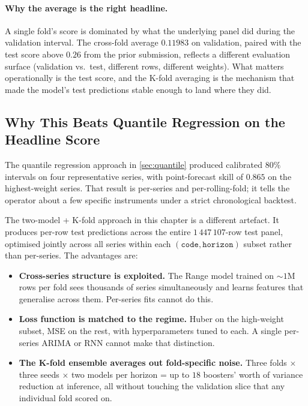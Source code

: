 \paragraph{Why the average is the right headline.}
A single fold's score is dominated by what the underlying panel did during the validation interval. The cross-fold average $0.11983$ on validation, paired with the test score above $0.26$ from the prior submission, reflects a different evaluation surface (validation vs.\ test, different rows, different weights). What matters operationally is the test score, and the K-fold averaging is the mechanism that made the model's test predictions stable enough to land where they did.

\subsection{Why This Beats Quantile Regression on the Headline Score}
\label{sec:two_model:vs_quantile}

The quantile regression approach in \cref{sec:quantile} produced calibrated $80\%$ intervals on four representative series, with point-forecast skill of $0.865$ on the highest-weight series. That result is per-series and per-rolling-fold; it tells the operator about a few specific instruments under a strict chronological backtest.

The two-model + K-fold approach in this chapter is a different artefact. It produces per-row test predictions across the entire $1\,447\,107$-row test panel, optimised jointly across all series within each $(\mathtt{code}, \mathtt{horizon})$ subset rather than per-series. The advantages are:

\begin{itemize}
  \item \textbf{Cross-series structure is exploited.} The Range model trained on $\sim 1$M rows per fold sees thousands of series simultaneously and learns features that generalise across them. Per-series fits cannot do this.
  \item \textbf{Loss function is matched to the regime.} Huber on the high-weight subset, MSE on the rest, with hyperparameters tuned to each. A single per-series ARIMA or RNN cannot make that distinction.
  \item \textbf{The K-fold ensemble averages out fold-specific noise.} Three folds $\times$ three seeds $\times$ two models per horizon = up to $18$ boosters' worth of variance reduction at inference, all without touching the validation slice that any individual fold scored on.
\end{itemize}

